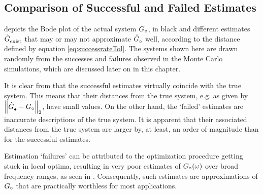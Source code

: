 \subsection{Comparison of Successful and Failed Estimates}


  depicts the Bode plot of the actual system $\true{G}$, in black
 and different estimates $\model{exist}$
 that may or may not approximate $\model{\trueSymbol}$ well, according to the distance defined by equation \eqref{eq:successrateTol}.
 The systems shown here are drawn randomly from the successes and failures observed in the Monte Carlo simulations, which are discussed later on in this chapter.
 
 It is clear from  that the successful estimates virtually coincide with the true system. This means 
that their distances from the true system, e.g. as given by $\norm[2]{\model{\bullet} - \true{G}}$, have small values. 
On the other hand, the `failed' estimates are inaccurate descriptions of the true system. It is apparent that their associated distances from the true system are larger by, at least, an order of magnitude than for the successful estimates.
 
 Estimation `failures' can be attributed to the optimization procedure getting stuck in local optima, resulting in very poor estimates of $\true{G}(\omega)$ over broad frequency ranges, as seen in . 
 Consequently, such estimates are approximations of $\true{G}$ that are practically worthless for most applications.


